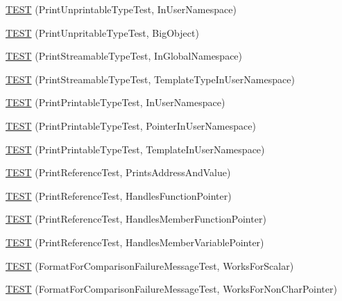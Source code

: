 \begin{DoxyCompactItemize}
\item 
\hyperlink{namespacetesting_1_1gtest__printers__test_a0aa1499e978bdde6c71e49ecc9db695b}{T\+E\+ST} (Print\+Unprintable\+Type\+Test, In\+User\+Namespace)
\item 
\hyperlink{namespacetesting_1_1gtest__printers__test_a6b6fba2a191094244f8aa78a4933a2c5}{T\+E\+ST} (Print\+Unpritable\+Type\+Test, Big\+Object)
\item 
\hyperlink{namespacetesting_1_1gtest__printers__test_a80fe9d71227a97b12fd5336a823c3d17}{T\+E\+ST} (Print\+Streamable\+Type\+Test, In\+Global\+Namespace)
\item 
\hyperlink{namespacetesting_1_1gtest__printers__test_a8ccd96504d676671a0429073d5012ff1}{T\+E\+ST} (Print\+Streamable\+Type\+Test, Template\+Type\+In\+User\+Namespace)
\item 
\hyperlink{namespacetesting_1_1gtest__printers__test_a52f5df394111bcc55aecc59ce426088d}{T\+E\+ST} (Print\+Printable\+Type\+Test, In\+User\+Namespace)
\item 
\hyperlink{namespacetesting_1_1gtest__printers__test_a3da6191eff6b016540024c2bfccdd90b}{T\+E\+ST} (Print\+Printable\+Type\+Test, Pointer\+In\+User\+Namespace)
\item 
\hyperlink{namespacetesting_1_1gtest__printers__test_aa697a3cf25b7f51f26ab49ed8ac3dd31}{T\+E\+ST} (Print\+Printable\+Type\+Test, Template\+In\+User\+Namespace)
\item 
\hyperlink{namespacetesting_1_1gtest__printers__test_aeae9b61a9fe582c72580db1466631846}{T\+E\+ST} (Print\+Reference\+Test, Prints\+Address\+And\+Value)
\item 
\hyperlink{namespacetesting_1_1gtest__printers__test_aab47074bb60b087e80675a44ad8c88ba}{T\+E\+ST} (Print\+Reference\+Test, Handles\+Function\+Pointer)
\item 
\hyperlink{namespacetesting_1_1gtest__printers__test_a88f9089e0b19be4bda74a953d6a47d7b}{T\+E\+ST} (Print\+Reference\+Test, Handles\+Member\+Function\+Pointer)
\item 
\hyperlink{namespacetesting_1_1gtest__printers__test_af9c63486049ac0ec2a1db65904702eb3}{T\+E\+ST} (Print\+Reference\+Test, Handles\+Member\+Variable\+Pointer)
\item 
\hyperlink{namespacetesting_1_1gtest__printers__test_aa7429c3701e464d0047a82686a5e8a46}{T\+E\+ST} (Format\+For\+Comparison\+Failure\+Message\+Test, Works\+For\+Scalar)
\item 
\hyperlink{namespacetesting_1_1gtest__printers__test_adb093d9323bfb766be8c91215c46056e}{T\+E\+ST} (Format\+For\+Comparison\+Failure\+Message\+Test, Works\+For\+Non\+Char\+Pointer)

\end{DoxyCompactItemize}
